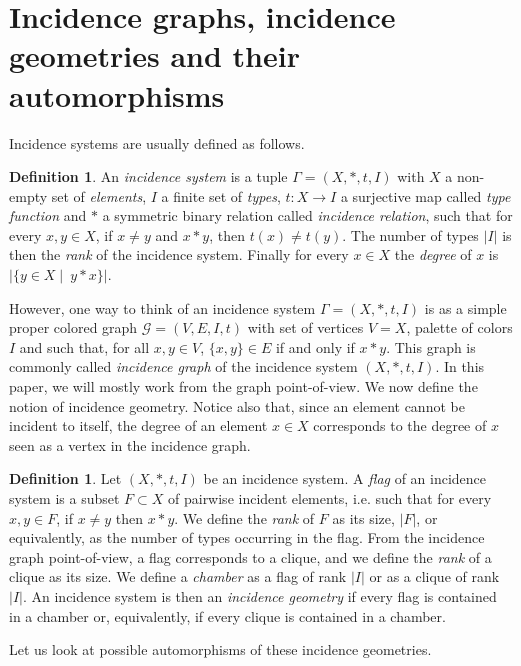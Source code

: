 \documentclass{amsart}
\theoremstyle{definition}
\newtheorem{definition}[theorem]{Definition}
\theoremstyle{remark}
\newcommand{\G}{\mathcal{G}}
\begin{document}
\section{Incidence graphs, incidence geometries and their automorphisms}\label{sec:def incidence}

Incidence systems are usually defined as follows.

\begin{definition}
An \emph{incidence system} is a tuple $\Gamma=(X,\ast,t,I)$ with $X$ a non-empty set of \emph{elements}, $I$ a finite set of \emph{types}, $t\colon X\to I$ a surjective map called \emph{type function} and $\ast$ a symmetric binary relation called \emph{incidence relation}, such that for every $x,y\in X$, if $x\neq y$ and $x\ast y$, then $t(x)\neq t(y)$. The number of types $|I|$ is then the \emph{rank} of the incidence system. Finally for every $x\in X$ the \emph{degree} of $x$ is $|\{y\in X\mid\ y\ast x\}|$. 
\end{definition}

However, one way to think of an incidence system $\Gamma=(X,\ast,t,I)$ is as a simple proper colored graph $\G=(V,E,I,t)$ with set of vertices $V=X$, palette of colors $I$ and such that, for all $x,y\in V$, $\{x,y\}\in E$ if and only if $x\ast y$. This graph is commonly called \emph{incidence graph} of the incidence system $(X,\ast,t,I)$. In this paper, we will mostly work from the graph point-of-view. 
We now define the notion of incidence geometry. Notice also that, since an element cannot be incident to itself, the degree of an element $x\in X$ corresponds to the degree of $x$ seen as a vertex in the incidence graph.

\begin{definition}
Let $(X,\ast,t,I)$ be an incidence system. 
A \emph{flag} of an incidence system is a subset $F\subset X$ of pairwise incident elements, i.e. such that for every $x,y\in F$, if $x\neq y$ then $x\ast y$. We define the \emph{rank} of $F$ as its size,  $|F|$, or equivalently, as the number of types occurring in the flag. From the incidence graph point-of-view, a flag corresponds to a clique, and we define the \emph{rank} of a clique as its size. We define a \emph{chamber} as a flag of rank $|I|$ or as a clique of rank $|I|$. An incidence system is then an \emph{incidence geometry} if every flag is contained in a chamber or, equivalently, if every clique is contained in a chamber.
\end{definition}

Let us look at possible automorphisms of these incidence geometries.
\end{document}
